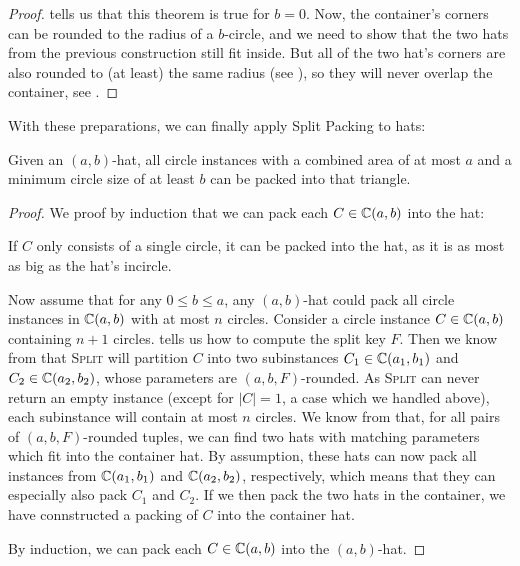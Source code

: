 \documentclass[a4paper,style=print,oneside,bibliography=totoc,nexus,lnum,extramargin]{tubsbook}
\begin{document}
\begin{proof}
     tells us that this theorem is true for $b = 0$. Now, the container's corners can be rounded to the radius of a $b$-circle, and we need to show that the two hats from the previous construction still fit inside. But all of the two hat's corners are also rounded to (at least) the same radius (see ), so they will never overlap the container, see .
\end{proof}


With these preparations, we can finally apply Split Packing to hats:

\begin{theorem}\label{th:hats}
    Given an $(a,b)$-hat, all circle instances with a combined area of at most $a$ and a minimum circle size of at least $b$ can be packed into that triangle.
\end{theorem}

\begin{proof}
    We proof by induction that we can pack each $C \in \mathbb{C}(a,b)$ into the hat:

    If $C$ only consists of a single circle, it can be packed into the hat, as it is as most as big as the hat's incircle.

    Now assume that for any $0 \le b \le a$, any $(a,b)$-hat could pack all circle instances in $\mathbb{C}(a,b)$ with at most $n$ circles. Consider a circle instance $C \in \mathbb{C}(a,b)$ containing $n+1$ circles.
     tells us how to compute the split key $F$.
    Then we know from  that \textsc{Split} will partition $C$ into two subinstances $C_1 \in \mathbb{C}(a_1, b_1)$ and $C_2 \in \mathbb{C}(a_2, b_2)$, whose parameters are $(a,b,F)$-rounded. As \textsc{Split} can never return an empty instance (except for $|C| = 1$, a case which we handled above), each subinstance will contain at most $n$ circles. We know from  that, for all pairs of $(a,b,F)$-rounded tuples, we can find two hats with matching parameters which fit into the container hat. By assumption, these hats can now pack all instances from $\mathbb{C}(a_1, b_1)$ and $\mathbb{C}(a_2, b_2)$, respectively, which means that they can especially also pack $C_1$ and $C_2$. If we then pack the two hats in the container, we have connstructed a packing of $C$ into the container hat.

    By induction, we can pack each $C \in \mathbb{C}(a,b)$ into the $(a,b)$-hat.
\end{proof}
\end{document}
